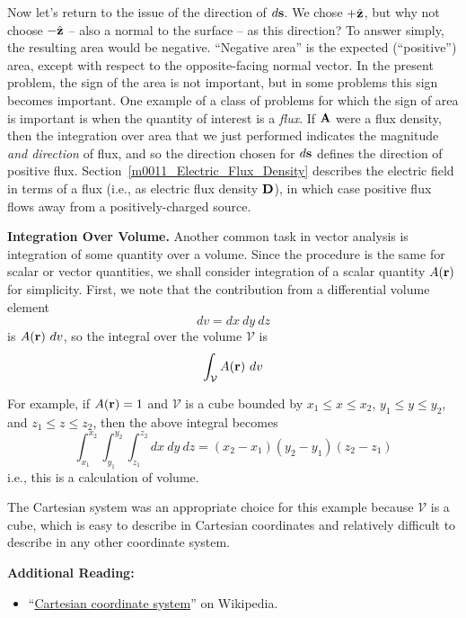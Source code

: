 Now let's return to the issue of the direction of $d{\bf s}$.  We chose $+\hat{\bf z}$, but why not choose $-\hat{\bf z}$ -- also a normal to the surface -- as this direction?  To answer simply, the resulting area would be negative.  ``Negative area'' is the expected (``positive'') area, except with respect to the opposite-facing normal vector.  In the present problem, the sign of the area is not important, but in some problems this sign becomes important.
One example of a class of problems for which the sign of area is important is when the quantity of interest is a \emph{flux}.  
If ${\bf A}$ were a flux density, then the integration over area that we just performed indicates the magnitude \emph{and direction} of flux, and so the direction chosen for $d{\bf s}$ defines the direction of positive flux.  
Section~\ref{m0011_Electric_Flux_Density} describes the electric field in terms of a flux (i.e., as electric flux density ${\bf D}$), in which case positive flux flows away from a positively-charged source.

{\bf Integration Over Volume.}  
Another common task in vector analysis is integration of some quantity over a volume.
Since the procedure is the same for scalar or vector quantities, we shall consider integration of a scalar quantity $A({\bf r})$ for simplicity.
First, we note that the contribution from a differential volume element 
%
\begin{equation}
dv = dx~dy~dz
\end{equation}
%
is $A({\bf r})~dv$, so the integral over the volume ${\mathcal V}$ is
%
\begin{equation}
\int_{\mathcal V} A({\bf r})~dv
\end{equation}

For example, if $A({\bf r})=1$ and $\mathcal{V}$ is a cube bounded by $x_1\le x \le x_2$, $y_1\le y \le y_2$, and $z_1\le z \le z_2$, then the above integral becomes
%
\begin{equation}
\int_{x_1}^{x_2}\int_{y_1}^{y_2}\int_{z_1}^{z_2}{dx~dy~dz} = \left(x_2-x_1\right)\left(y_2-y_1\right)\left(z_2-z_1\right)
\end{equation} 
%
i.e., this is a calculation of volume.

The Cartesian system was an appropriate choice for this example because ${\mathcal V}$ is a cube, which is easy to describe in Cartesian coordinates and relatively difficult to describe in any other coordinate system.


{\bf Additional Reading:}
\begin{itemize}
\item ``\href{https://en.wikipedia.org/wiki/Cartesian_coordinate_system}{Cartesian coordinate system}'' on Wikipedia.
\end{itemize}


